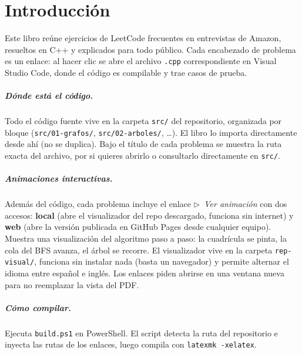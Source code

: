 \chapter*{Introducción}

Este libro reúne ejercicios de LeetCode frecuentes en entrevistas de Amazon,
resueltos en C++ y explicados para todo público. Cada encabezado de problema
es un enlace: al hacer clic se abre el archivo \texttt{.cpp} correspondiente
en Visual Studio Code, donde el código es compilable y trae casos de prueba.

\paragraph{Dónde está el código.} Todo el código fuente vive en la carpeta
\texttt{src/} del repositorio, organizada por bloque (\texttt{src/01-grafos/},
\texttt{src/02-arboles/}, \ldots). El libro lo importa directamente desde ahí
(no se duplica). Bajo el título de cada problema se muestra la ruta exacta del
archivo, por si quieres abrirlo o consultarlo directamente en \texttt{src/}.

\paragraph{Animaciones interactivas.} Además del código, cada problema incluye
el enlace \emph{\ensuremath{\triangleright}\ Ver animación} con dos accesos:
\textbf{local} (abre el visualizador del repo descargado, funciona sin internet)
y \textbf{web} (abre la versión publicada en GitHub Pages desde cualquier equipo).
Muestra una visualización del algoritmo paso a paso: la cuadrícula se pinta, la
cola del BFS avanza, el árbol se recorre. El visualizador vive en la carpeta
\texttt{rep-visual/}, funciona sin instalar nada (basta un navegador) y permite
alternar el idioma entre español e inglés. Los enlaces piden abrirse en una
ventana nueva para no reemplazar la vista del PDF.

\paragraph{Cómo compilar.} Ejecuta \texttt{build.ps1} en PowerShell. El script
detecta la ruta del repositorio e inyecta las rutas de los enlaces, luego
compila con \texttt{latexmk -xelatex}.
